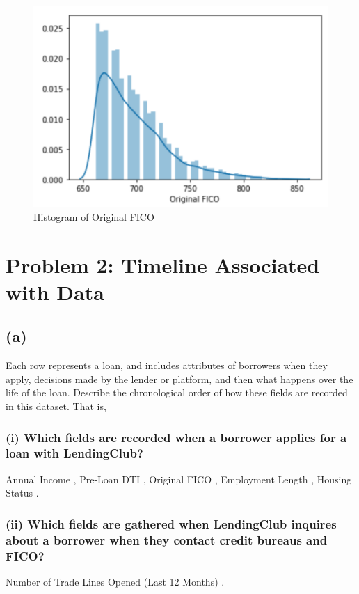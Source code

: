 \documentclass{homework}
\begin{document}
    
    
       \begin{figure}[h!]
    \centering
    \includegraphics[scale=0.50]{"FICO.png"}
    \caption{Histogram of Original FICO}
    \label{fig:original fico_hist}
    \end{figure}


\newpage






\section*{Problem 2: Timeline Associated with Data}
\subsection*{(a)}
Each row represents a loan, and includes attributes of borrowers when they apply, decisions made by the lender or platform, and then what happens over the life of the loan. Describe the chronological order of how these fields are recorded in this dataset. That is,
\subsubsection*{(i) Which fields are recorded when a borrower applies for a loan with LendingClub?}
Annual Income , Pre-Loan DTI  , Original FICO   , Employment Length  , Housing Status .
\subsubsection*{(ii) Which fields are gathered when LendingClub inquires about a borrower when they contact credit bureaus and FICO?}
Number of Trade Lines Opened (Last 12 Months)    .
\end{document}
